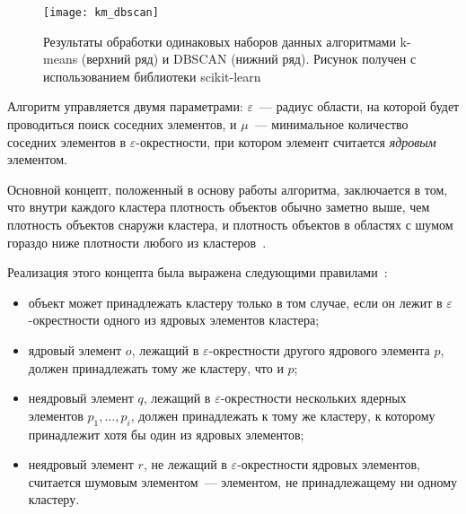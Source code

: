 \begin{figure}[ht!]
    \centering
    \texttt{[image: km\_dbscan]}\\[1ex]
    \parbox{.9\textwidth}{\caption{Результаты обработки одинаковых наборов данных алгоритмами k-means (верхний ряд) и DBSCAN (нижний ряд). Рисунок получен с использованием библиотеки scikit-learn~\cite{sklearn}} \label{pic:km-dbscan}}
\end{figure}

Алгоритм управляется двумя параметрами: \( \varepsilon \)~--- радиус области, на которой будет проводиться поиск соседних элементов, и \( \mu \)~--- минимальное количество соседних элементов в \( \varepsilon \)-окрестности, при котором элемент считается \emph{ядровым} элементом.

Основной концепт, положенный в основу работы алгоритма, заключается в том, что внутри каждого кластера плотность объектов обычно заметно выше, чем плотность объектов снаружи кластера, и плотность объектов в областях с шумом гораздо ниже плотности любого из кластеров~\cite{dbscan-pos}.

Реализация этого концепта была выражена следующими правилами~\cite{cod}:
\begin{itemize}
    \item объект может принадлежать кластеру только в том случае, если он лежит в \( \varepsilon \)-окрестности одного из ядровых элементов кластера;
    \item ядровый элемент \( o \), лежащий в \( \varepsilon \)-окрестности другого ядрового элемента \( p \), должен принадлежать тому же кластеру, что и \( p \);
    \item неядровый элемент \( q \), лежащий в \( \varepsilon \)-окрестности нескольких ядерных элементов \( p_1, \ldots, p_i \), должен принадлежать к тому же кластеру, к которому принадлежит хотя бы один из ядровых элементов;
    \item неядровый элемент \( r \), не лежащий в \( \varepsilon \)-окрестности ядровых элементов, считается шумовым элементом~--- элементом, не принадлежащему ни одному кластеру.
\end{itemize}

